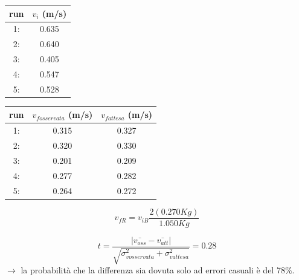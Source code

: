 \documentclass[a4paper]{article}
\theoremstyle{definition}
\begin{document}
\begin{minipage}[c]{0.5\textwidth}
	\captionsetup{labelformat=empty}
	\centering
	\begin{tabular}{||cc||}
		\hline
		\hline
		run &  \(v_{i}\) (m/s)\\
		\hline
		1: &0.635  \\ 
		2: &0.640 \\
		3: &0.405 \\
		4: &0.547\\
		5: &0.528 \\
		\hline
		\hline
	\end{tabular}
	
\end{minipage}
\begin{minipage}[c]{0.5\textwidth}
	\captionsetup{labelformat=empty}
	\centering
	\begin{tabular}{||ccc||}
		\hline
		\hline
		run &  \(v_{fosservata}\) (m/s) & \(v_{fattesa}\) (m/s)\\
		\hline
		1: &0.315  & 0.327\\
		2: &0.320 &0.330\\
		3: &0.201&0.209\\
		4: &0.277 &0.282\\
		5: & 0.264&0.272\\
		\hline
		\hline
	\end{tabular}
\end{minipage}

\[v_{f R} = v_{i B} \frac{2 (0.270 Kg)}{1.050 Kg}\]

\[t = \frac{ \left |\bar{v_{oss}}  - \bar{v_{att}} \right |}{\sqrt{\sigma_{vosservata}^{2}+ \sigma_{vattesa}^{2}}} = 0.28 \]
\noindent \(\rightarrow\) la probabilità che la differenza sia dovuta solo ad errori casuali è del 78\(\%\).\\\\\\\\\\\\\\\\\\\\\\\\\\
\end{document}
